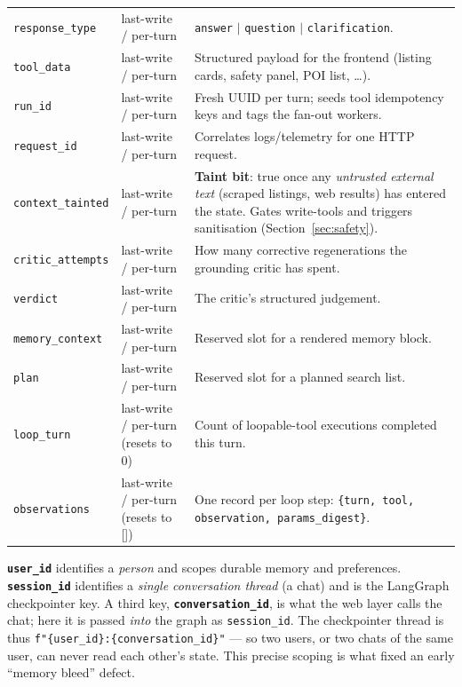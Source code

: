 \documentclass[11pt,a4paper]{article}
\newcommand{\code}[1]{\texttt{\small #1}}
\begin{document}
\begin{longtable}{@{}p{} p{} p{}@{}}
\code{response\_type} & last-write / per-turn & \code{answer} $\mid$ \code{question} $\mid$ \code{clarification}.\\
\code{tool\_data} & last-write / per-turn & Structured payload for the frontend (listing cards, safety panel, POI list, \dots).\\
\code{run\_id} & last-write / per-turn & Fresh UUID per turn; seeds tool idempotency keys and tags the fan-out workers.\\
\code{request\_id} & last-write / per-turn & Correlates logs/telemetry for one HTTP request.\\
\code{context\_tainted} & last-write / per-turn & \textbf{Taint bit}: true once any \emph{untrusted external text} (scraped listings, web results) has entered the state. Gates write-tools and triggers sanitisation (Section~\ref{sec:safety}).\\
\code{critic\_attempts} & last-write / per-turn & How many corrective regenerations the grounding critic has spent.\\
\code{verdict} & last-write / per-turn & The critic's structured judgement.\\
\code{memory\_context} & last-write / per-turn & Reserved slot for a rendered memory block.\\
\code{plan} & last-write / per-turn & Reserved slot for a planned search list.\\
\code{loop\_turn} & last-write / per-turn (resets to 0) & Count of loopable-tool executions completed this turn.\\
\code{observations} & last-write / per-turn (resets to []) & One record per loop step: \code{\{turn, tool, observation, params\_digest\}}.\\
\bottomrule
\end{longtable}

\begin{keybox}
\textbf{\code{user\_id}} identifies a \emph{person} and scopes durable memory and
preferences. \textbf{\code{session\_id}} identifies a \emph{single conversation
thread} (a chat) and is the LangGraph checkpointer key. A third key,
\textbf{\code{conversation\_id}}, is what the web layer calls the chat; here it is
passed \emph{into} the graph as \code{session\_id}. The checkpointer thread is thus
\code{f"\{user\_id\}:\{conversation\_id\}"} --- so two users, or two chats of the same
user, can never read each other's state. This precise scoping is what fixed an early
``memory bleed'' defect.
\end{keybox}
\end{document}
